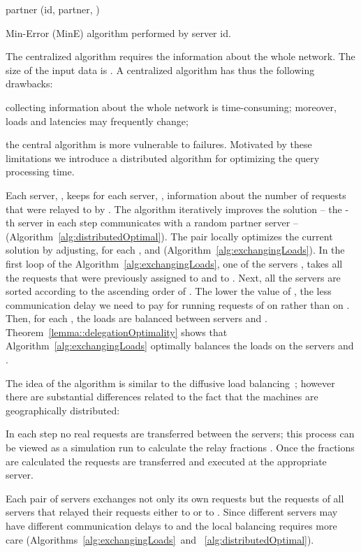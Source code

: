 \documentclass[11pt]{article}
\begin{document}
\begin{algorithm}[h]
  partner  \;
  \transfer(id, partner, )\;
  \caption{Min-Error (MinE) algorithm performed by server id.}
  \label{alg:distributedOptimal}
\end{algorithm}

The centralized algorithm requires the information about the whole network. The size of the input data is . A centralized algorithm has thus the following drawbacks:
\begin{inparaenum}[(i)] 
\item collecting information about the whole network is time-consuming; moreover, loads and latencies may frequently change;
\item the central algorithm is more vulnerable to failures. 
Motivated by these limitations we introduce a distributed algorithm for optimizing the query processing time.
\end{inparaenum}



Each server, , keeps for each server, , information about the number of requests that were relayed to  by . The algorithm iteratively improves the solution -- the -th server in each step communicates with a random partner server --  (Algorithm~\ref{alg:distributedOptimal}). The pair  locally optimizes the current solution by adjusting, for each ,  and  (Algorithm~\ref{alg:exchangingLoads}). 
In the first loop of the Algorithm~\ref{alg:exchangingLoads}, one of the servers , takes all the requests that were previously assigned to  and to . Next, all the servers  are sorted according to the ascending order of . The lower the value of , the less communication delay we need to pay for running requests of  on  rather than on . Then, for each , the loads are balanced between servers  and .  Theorem~\ref{lemma::delegationOptimality} shows that Algorithm~\ref{alg:exchangingLoads} 
optimally balances the loads on the servers  and .



The idea of the algorithm is similar to the diffusive load balancing~\cite{conf/ipps/AdolphsB12, Ackermann:2009:DAQ:1583991.1584046, Berenbrink:2011:DSL:2133036.2133152}; however there are substantial differences related to the fact that the machines are geographically distributed: \begin{inparaenum}[(i)] 
\item In each step no real requests are transferred between the servers; this process can be viewed as a simulation run to calculate the relay fractions . Once the fractions are calculated the requests are transferred and executed at the appropriate server. 
\item Each pair  of servers exchanges not only its own requests but the requests of all servers that relayed their requests either to  or to . Since different servers may have different 
communication delays to  and  the local balancing requires more care (Algorithms~\ref{alg:exchangingLoads}~and ~\ref{alg:distributedOptimal}).
\end{inparaenum}
\end{document}
